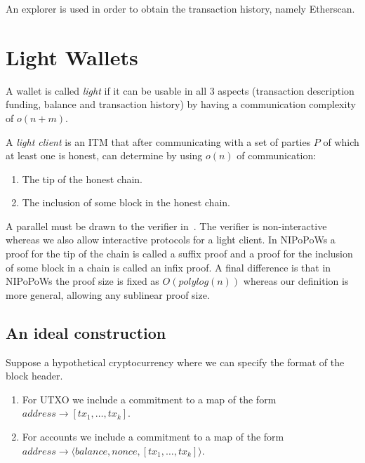 \documentclass[sigconf,authordraft]{acmart}
\providecommand{\tpl}[1]{\ensuremath{\langle#1\rangle}}
\begin{document}
An explorer is used in order to obtain the transaction history, namely Etherscan.

\section{Light Wallets}
\begin{definition}
A wallet is called \emph{light} if it can be usable in all 3 aspects (transaction description funding, balance and transaction history) by having a communication complexity of $o(n+m)$.
\end{definition}

\begin{definition}
A \emph{light client} is an ITM that after communicating with a set of parties $P$ of which at least one is honest, can determine by using $o(n)$ of communication:
\begin{enumerate}
    \item The tip of the honest chain.
    \item The inclusion of some block in the honest chain.
\end{enumerate}
\end{definition}

A parallel must be drawn to the verifier in~\cite{nipopows}. The verifier is non-interactive whereas we also allow interactive protocols for a light client. In NIPoPoWs a proof for the tip of the chain is called a suffix proof and a proof for the inclusion of some block in a chain is called an infix proof. A final difference is that in NIPoPoWs the proof size is fixed as $O(polylog(n))$ whereas our definition is more general, allowing any sublinear proof size.

\subsection{An ideal construction}
Suppose a hypothetical cryptocurrency where we can specify the format of the block header.

\begin{enumerate}
    \item For UTXO we include a commitment to a map of the form $address \rightarrow [tx_1, \dots, tx_k]$.
    \item For accounts we include a commitment to a map of the form $address \rightarrow \tpl{balance, nonce, [tx_1, \dots, tx_k]}$.
\end{enumerate}
\end{document}
